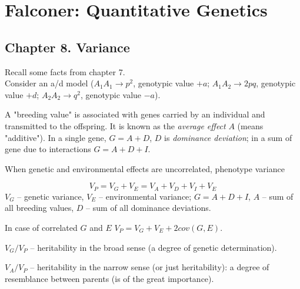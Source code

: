 \documentclass[main.tex]{subfiles}
\begin{document}
\section{Falconer: Quantitative Genetics}

\subsection{Chapter 8. Variance}

\begin{leftbar}

Recall some facts from chapter 7. \\

Consider an a/d model ($ A_1 A_1 \to p^2$, genotypic value $ +a $; $ A_1 A_2 \to 2pq$, genotypic value $+d$; $ A_2 A_2 \to q^2$, genotypic value $ -a $).

A "breeding value"\hspace{0pt} is associated with genes carried by an individual and transmitted to the offspring.
It is known as the \emph{average effect} $ A $ (means "additive"). In a single gene, $ G = A + D $, $ D $ is \emph{dominance deviation}; in a sum of gene due to interactions $ G = A + D + I $.

\end{leftbar}

When genetic and environmental effects are uncorrelated, phenotype variance

\[ V_P = V_G + V_E = V_A + V_D + V_I + V_E  \]
$ V_G $ -- genetic variance, $ V_E $ -- environmental variance; $ G = A + D + I $, $ A $ -- sum of all breeding values, $ D $ -- sum of all dominance deviations.

In case of correlated $ G $ and $ E $ $ V_P = V_G + V_E + 2 cov(G,E) $.

$ V_G / V_P $ -- heritability in the broad sense (a degree of genetic determination).

$ V_A / V_P $ -- heritability in the narrow sense (or just heritability): a degree of resemblance between parents (is of the great importance).
\end{document}
